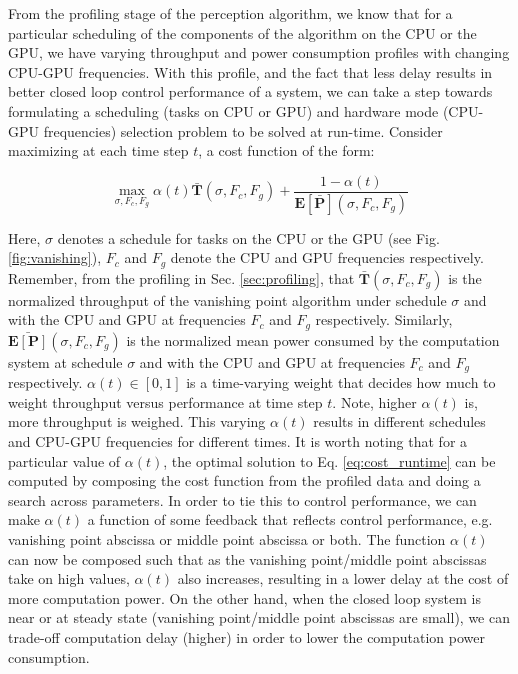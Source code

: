 
From the profiling stage of the perception algorithm, we know that for a particular scheduling of the components of the algorithm on the CPU or the GPU, we have varying throughput and power consumption profiles with changing CPU-GPU frequencies. With this profile, and the fact that less delay results in better closed loop control performance of a system, we can take a step towards formulating a scheduling (tasks on CPU or GPU) and hardware mode (CPU-GPU frequencies) selection problem to be solved at run-time. Consider maximizing at each time step $t$, a cost function of the form:

\begin{equation}
\max_{\sigma,F_{c},F_{g}} \alpha(t)\mathbf{\bar{T}}(\sigma,F_{c},F_{g}) + \frac{1-\alpha(t)}{\mathbf{E[\bar{P}]}(\sigma,F_{c},F_{g})}
\label{eq:cost_runtime}
\end{equation}

Here, $\sigma$ denotes a schedule for tasks on the CPU or the GPU (see Fig. \ref{fig:vanishing}), $F_c$ and $F_g$ denote the CPU and GPU frequencies respectively. Remember, from the profiling in Sec. \ref{sec:profiling}, that $\mathbf{\bar{T}}(\sigma,F_{c},F_{g})$ is the normalized throughput of the vanishing point algorithm under schedule $\sigma$ and with the CPU and GPU at frequencies $F_c$ and $F_g$ respectively. Similarly, $\mathbf{\bar{E[P]}}(\sigma,F_{c},F_{g})$ is the normalized mean power consumed by the computation system at schedule $\sigma$ and with the CPU and GPU at frequencies $F_c$ and $F_g$ respectively. $\alpha(t) \in [0,1]$ is a time-varying weight that decides how much to weight throughput versus performance at time step $t$. Note, higher $\alpha(t)$ is, more throughput is weighed. This varying $\alpha(t)$ results in different schedules and CPU-GPU frequencies for different times. It is worth noting that for a particular value of $\alpha(t)$, the optimal solution to Eq. \ref{eq:cost_runtime} can be computed by composing the cost function from the profiled data and doing a search across parameters. In order to tie this to control performance, we can make $\alpha(t)$ a function of some feedback that reflects control performance, e.g. vanishing point abscissa or middle point abscissa or both. The function $\alpha(t)$ can now be composed such that as the vanishing point/middle point abscissas take on high values, $\alpha(t)$ also increases, resulting in a lower delay at the cost of more computation power. On the other hand, when the closed loop system is near or at steady state (vanishing point/middle point abscissas are small), we can trade-off computation delay (higher) in order to lower the computation power consumption. 